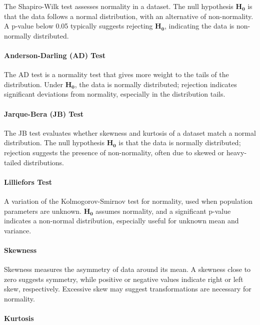 \documentclass[11pt]{article}
\begin{document}
The Shapiro-Wilk test assesses normality in a dataset. The null hypothesis $\mathbf{H}_{\mathbf{0}}$ is that the data follows a normal distribution, with an alternative of non-normality. A p-value below 0.05 typically suggests rejecting $\mathbf{H}_{\mathbf{0}}$, indicating the data is non-normally distributed.

\paragraph{Anderson-Darling (AD) Test}

The AD test is a normality test that gives more weight to the tails of the distribution. Under $\mathbf{H}_{\mathbf{0}}$, the data is normally distributed; rejection indicates significant deviations from normality, especially in the distribution tails.

\paragraph{Jarque-Bera (JB) Test}

The JB test evaluates whether skewness and kurtosis of a dataset match a normal distribution. The null hypothesis $\mathbf{H}_{\mathbf{0}}$ is that the data is normally distributed; rejection suggests the presence of non-normality, often due to skewed or heavy-tailed distributions.

\paragraph{Lilliefors Test}

A variation of the Kolmogorov-Smirnov test for normality, used when population parameters are unknown. $\mathbf{H}_{\mathbf{0}}$ assumes normality, and a significant p-value indicates a non-normal distribution, especially useful for unknown mean and variance.

\paragraph{Skewness}

Skewness measures the asymmetry of data around its mean. A skewness close to zero suggests symmetry, while positive or negative values indicate right or left skew, respectively. Excessive skew may suggest transformations are necessary for normality.

\paragraph{Kurtosis}
\end{document}
